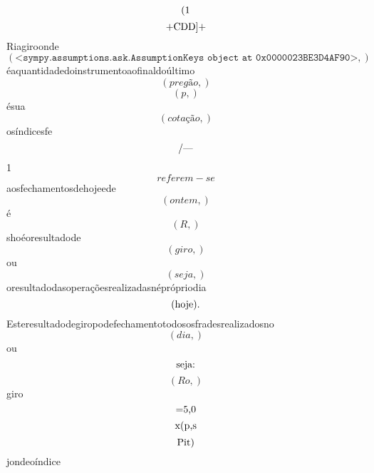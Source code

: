 \documentclass{article}
\begin{document}
\begin{equation}
$(1$
\end{equation}\begin{equation}
$+CDD]+$
\end{equation}Riagiroonde\begin{equation}
\left( \mathtt{\text{<sympy.assumptions.ask.AssumptionKeys object at 0x0000023BE3D4AF90>}},\right)
\end{equation}éaquantidadedoinstrumentoaofinaldoúltimo\begin{equation}
\left( pregão,\right)
\end{equation}\begin{equation}
\left( p,\right)
\end{equation}ésua\begin{equation}
\left( cotação,\right)
\end{equation}osíndicesfe\begin{equation}
$/—$
\end{equation}1\begin{equation}
referem - se
\end{equation}aosfechamentosdehojeede\begin{equation}
\left( ontem,\right)
\end{equation}é\begin{equation}
\left( R,\right)
\end{equation}shoéoresultadode\begin{equation}
\left( giro,\right)
\end{equation}ou\begin{equation}
\left( seja,\right)
\end{equation}oresultadodasoperaçõesrealizadasnéprópriodia\begin{equation}
$(hoje).$
\end{equation}Esteresultadodegiropodefechamentotodososfradesrealizadosno\begin{equation}
\left( dia,\right)
\end{equation}ou\begin{equation}
$seja:$
\end{equation}\begin{equation}
\left( Ro,\right)
\end{equation}giro\begin{equation}
$=5,0$
\end{equation}\begin{equation}
$x(p,s$
\end{equation}\begin{equation}
$Pit)$
\end{equation}jondeoíndice\begin{equation}

\end{equation}
\end{document}
